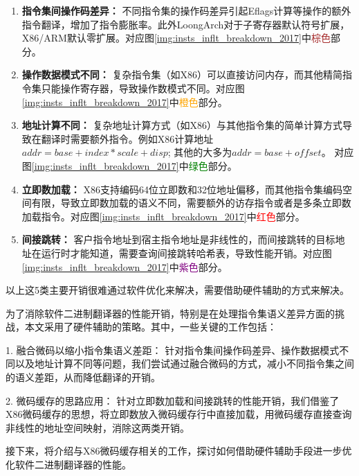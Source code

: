 \begin{enumerate}
  \item \textbf{指令集间操作码差异：} 不同指令集的操作码差异引起Eflags计算等操作的额外指令翻译，增加了指令膨胀率。此外LoongArch对于子寄存器默认符号扩展，X86/ARM默认零扩展。对应图\ref{img:insts_inflt_breakdown_2017}中\textcolor{brown}{棕色}部分。
  
  \item \textbf{操作数据模式不同：} 复杂指令集（如X86）可以直接访问内存，而其他精简指令集只能操作寄存器，导致操作数模式不同。对应图\ref{img:insts_inflt_breakdown_2017}中\textcolor{orange}{橙色}部分。
  
  \item \textbf{地址计算不同：} 复杂地址计算方式（如X86）与其他指令集的简单计算方式导致在翻译时需要额外指令。例如X86计算地址$addr = base + index * scale +disp$; 其他的大多为$addr = base + offset$。 对应图\ref{img:insts_inflt_breakdown_2017}中\textcolor{green}{绿色}部分。
  
  \item \textbf{立即数加载：} X86支持编码64位立即数和32位地址偏移，而其他指令集编码空间有限，导致立即数加载的语义不同，需要额外的访存指令或者是多条立即数加载指令。对应图\ref{img:insts_inflt_breakdown_2017}中\textcolor{red}{红色}部分。
  
  \item \textbf{间接跳转：} 客户指令地址到宿主指令地址是非线性的，而间接跳转的目标地址在运行时才能知道，需要查询间接跳转哈希表，导致性能开销。对应图\ref{img:insts_inflt_breakdown_2017}中\textcolor{purple}{紫色}部分。
  
\end{enumerate}

以上这5类主要开销很难通过软件优化来解决，需要借助硬件辅助的方式来解决。

为了消除软件二进制翻译器的性能开销，特别是在处理指令集语义差异方面的挑战，本文采用了硬件辅助的策略。其中，一些关键的工作包括：

1. 融合微码以缩小指令集语义差距： 针对指令集间操作码差异、操作数据模式不同以及地址计算不同等问题，我们尝试通过融合微码的方式，减小不同指令集之间的语义差距，从而降低翻译的开销。

2. 微码缓存的思路应用： 针对立即数加载和间接跳转的性能开销，我们借鉴了X86微码缓存的思想，将立即数放入微码缓存行中直接加载，用微码缓存直接查询非线性的地址空间映射，消除这两类开销。

接下来，将介绍与X86微码缓存相关的工作，探讨如何借助硬件辅助手段进一步优化软件二进制翻译器的性能。


